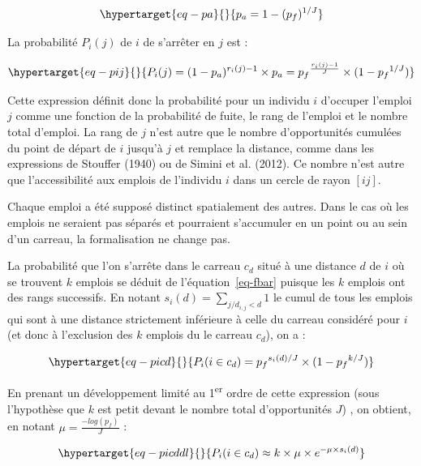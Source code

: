 \documentclass[
  10pt,
  a4paper,
  numbers=noendperiod,
  DIV=12]{scrartcl}
\begin{document}
\begin{equation}\protect\hypertarget{eq-pa}{}{
p_a = 1-(p_f)^{1/J}
}\label{eq-pa}\end{equation}

La probabilité \(P_i(j)\) de \(i\) de s'arrêter en \(j\) est :

\begin{equation}\protect\hypertarget{eq-pij}{}{
P_i(j) = (1-p_a)^{r_i(j)-1} \times p_a = {p_f}^{\frac {r_i(j)-1} {J}} \times (1-{p_f}^{1/J})
}\label{eq-pij}\end{equation}

Cette expression définit donc la probabilité pour un individu \(i\)
d'occuper l'emploi \(j\) comme une fonction de la probabilité de fuite,
le rang de l'emploi et le nombre total d'emploi. La rang de \(j\) n'est
autre que le nombre d'opportunités cumulées du point de départ de \(i\)
jusqu'à \(j\) et remplace la distance, comme dans les expressions de
Stouffer (1940) ou de Simini et al. (2012). Ce nombre n'est autre que
l'accessibilité aux emplois de l'individu \(i\) dans un cercle de rayon
\([ij]\).

Chaque emploi a été supposé distinct spatialement des autres. Dans le
cas où les emplois ne seraient pas séparés et pourraient s'accumuler en
un point ou au sein d'un carreau, la formalisation ne change pas.

La probabilité que l'on s'arrête dans le carreau \(c_d\) situé à une
distance \(d\) de \(i\) où se trouvent \(k\) emplois se déduit de
l'équation~\ref{eq-fbar} puisque les \(k\) emplois ont des rangs
successifs. En notant \(s_i(d)=\sum _{j/d_{i,j}<d}1\) le cumul de tous
les emplois qui sont à une distance strictement inférieure à celle du
carreau considéré pour \(i\) (et donc à l'exclusion des \(k\) emplois du
le carreau \(c_d\)), on a :

\begin{equation}\protect\hypertarget{eq-picd}{}{
P_i(i\in c_d) = {p_f}^{s_i(d)/J}\times(1-{p_f}^{ k/J})
}\label{eq-picd}\end{equation}

En prenant un développement limité au 1\textsuperscript{er} ordre de
cette expression (sous l'hypothèse que \(k\) est petit devant le nombre
total d'opportunités \(J\)) , on obtient, en notant
\(\mu=\frac{-log(p_f)}{J}\) :

\begin{equation}\protect\hypertarget{eq-picddl}{}{
P_i(i\in c_d) \approx k\times \mu \times e^{-\mu \times s_i(d)}
}\label{eq-picddl}\end{equation}
\end{document}
